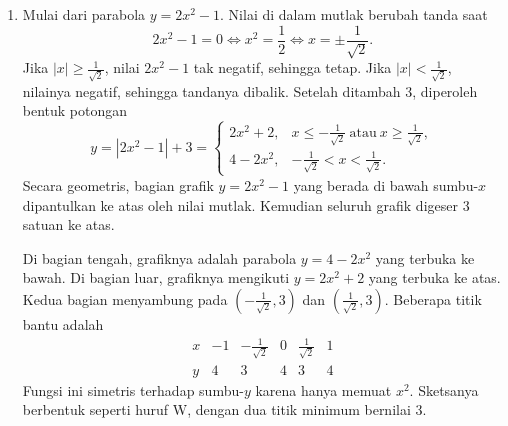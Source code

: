 \documentclass[11pt,a4paper]{article}
\begin{document}
\begin{enumerate}
\begin{enumerate}
      \item Cari titik potong kedua garis terlebih dahulu.
        Dari $g_1$, diperoleh $y=3-2x$.
        Sementara itu, persamaan $g_2$ dapat ditulis sebagai $4x-3y=4$.
        Substitusikan nilai $y$ dari $g_1$ ke $g_2$:
        \begin{align*}
          4x-3(3-2x)&=4,\\
          4x-9+6x&=4,\\
          10x&=13\quad\Longrightarrow\quad x=\frac{13}{10}.
        \end{align*}
        Masukkan kembali ke $y=3-2x$:
        \[
          y=3-2\left(\frac{13}{10}\right)
           =\frac{30}{10}-\frac{26}{10}=\frac25.
        \]
        Jadi, titik potongnya adalah $Q(\frac{13}{10},\frac25)$.
        Gunakan rumus jarak dua titik untuk menghitung jarak dari $P$ ke $Q$:
        \begin{align*}
          PQ&=\sqrt{\left(\frac{13}{10}-2\right)^2
                    +\left(\frac25-(-1)\right)^2}\\
            &=\sqrt{\left(-\frac7{10}\right)^2+\left(\frac75\right)^2}
             =\sqrt{\frac{49}{100}+\frac{196}{100}}\\
            &=\sqrt{\frac{245}{100}}=\boxed{\frac{7\sqrt5}{10}}.
        \end{align*}
    \end{enumerate}

  \newpage
  \item Mulai dari parabola $y=2x^2-1$.
    Nilai di dalam mutlak berubah tanda saat
    \[
      2x^2-1=0\iff x^2=\frac12\iff x=\pm\frac1{\sqrt2}.
    \]
    Jika $|x|\ge\frac1{\sqrt2}$, nilai $2x^2-1$ tak negatif, sehingga tetap.
    Jika $|x|<\frac1{\sqrt2}$, nilainya negatif, sehingga tandanya dibalik.
    Setelah ditambah $3$, diperoleh bentuk potongan
    \[
      \boxed{y=|2x^2-1|+3=
      \begin{cases}
        2x^2+2, & x\le-\frac1{\sqrt2}\ \text{atau}\ x\ge\frac1{\sqrt2},\\[4pt]
        4-2x^2, & -\frac1{\sqrt2}<x<\frac1{\sqrt2}.
      \end{cases}}
    \]
    Secara geometris, bagian grafik $y=2x^2-1$ yang berada di bawah sumbu-$x$
    dipantulkan ke atas oleh nilai mutlak.
    Kemudian seluruh grafik digeser $3$ satuan ke atas.

    Di bagian tengah, grafiknya adalah parabola $y=4-2x^2$ yang terbuka ke bawah.
    Di bagian luar, grafiknya mengikuti $y=2x^2+2$ yang terbuka ke atas.
    Kedua bagian menyambung pada $(-\frac1{\sqrt2},3)$ dan $(\frac1{\sqrt2},3)$.
    Beberapa titik bantu adalah
    \[
      \begin{array}{c|ccccc}
        x & -1 & -\frac1{\sqrt2} & 0 & \frac1{\sqrt2} & 1\\ \hline
        y & 4 & 3 & 4 & 3 & 4
      \end{array}
    \]
    Fungsi ini simetris terhadap sumbu-$y$ karena hanya memuat $x^2$.
    Sketsanya berbentuk seperti huruf W, dengan dua titik minimum bernilai $3$.


\end{enumerate}
\end{document}
